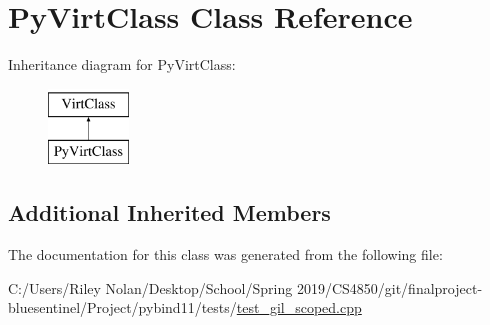 \hypertarget{class_py_virt_class}{}\section{Py\+Virt\+Class Class Reference}
\label{class_py_virt_class}
Inheritance diagram for Py\+Virt\+Class\+:\begin{figure}[H]
\begin{center}
\leavevmode
\includegraphics[height=2.000000cm]{class_py_virt_class}
\end{center}
\end{figure}
\subsection*{Additional Inherited Members}


The documentation for this class was generated from the following file\+:\begin{DoxyCompactItemize}
\item 
C\+:/\+Users/\+Riley Nolan/\+Desktop/\+School/\+Spring 2019/\+C\+S4850/git/finalproject-\/bluesentinel/\+Project/pybind11/tests/\mbox{\hyperlink{test__gil__scoped_8cpp}{test\+\_\+gil\+\_\+scoped.\+cpp}}\end{DoxyCompactItemize}
